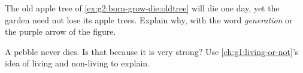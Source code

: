 \begin{exercise}[$\star\star$]\label{exo:g2:born-grow-die:9}
The old apple tree of \cref{ex:g2:born-grow-die:oldtree} will die
one day, yet the garden need not lose its apple trees. Explain
why, with the word \emph{generation} or the purple arrow of the
figure.
\end{exercise}

\begin{exercise}[$\star\star$]\label{exo:g2:born-grow-die:10}
A pebble never dies. Is that because it is very strong? Use
\cref{ch:g1:living-or-not}'s idea of living and non-living to
explain.
\end{exercise}
